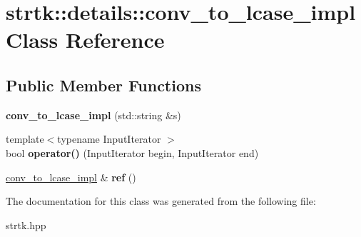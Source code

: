 \hypertarget{classstrtk_1_1details_1_1conv__to__lcase__impl}{\section{strtk\-:\-:details\-:\-:conv\-\_\-to\-\_\-lcase\-\_\-impl Class Reference}
\label{classstrtk_1_1details_1_1conv__to__lcase__impl}
}
\subsection*{Public Member Functions}
\begin{DoxyCompactItemize}
\item 
\hypertarget{classstrtk_1_1details_1_1conv__to__lcase__impl_abcce88a30d104ca130a8465cc5e6b8d0}{{\bfseries conv\-\_\-to\-\_\-lcase\-\_\-impl} (std\-::string \&s)}\label{classstrtk_1_1details_1_1conv__to__lcase__impl_abcce88a30d104ca130a8465cc5e6b8d0}

\item 
\hypertarget{classstrtk_1_1details_1_1conv__to__lcase__impl_adbacc15e95804f1f1cba2d7a9e31e6dc}{{\footnotesize template$<$typename Input\-Iterator $>$ }\\bool {\bfseries operator()} (Input\-Iterator begin, Input\-Iterator end)}\label{classstrtk_1_1details_1_1conv__to__lcase__impl_adbacc15e95804f1f1cba2d7a9e31e6dc}

\item 
\hypertarget{classstrtk_1_1details_1_1conv__to__lcase__impl_a5258aa98175de5fa240e46aff6b253fb}{\hyperlink{classstrtk_1_1details_1_1conv__to__lcase__impl}{conv\-\_\-to\-\_\-lcase\-\_\-impl} \& {\bfseries ref} ()}\label{classstrtk_1_1details_1_1conv__to__lcase__impl_a5258aa98175de5fa240e46aff6b253fb}

\end{DoxyCompactItemize}


The documentation for this class was generated from the following file\-:\begin{DoxyCompactItemize}
\item 
strtk.\-hpp\end{DoxyCompactItemize}

